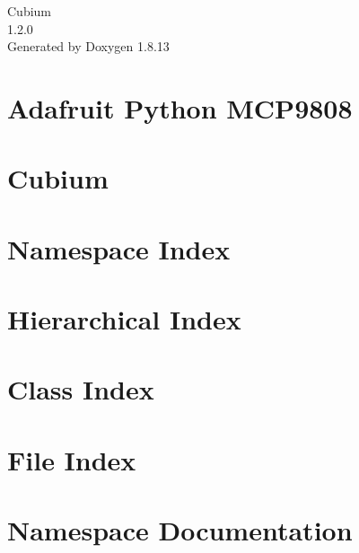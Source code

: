 \documentclass[twoside]{book}
\newcommand{\+}{\discretionary{\mbox{\scriptsize$\hookleftarrow$}}{}{}}
\newcommand{\clearemptydoublepage}{%
  \newpage{\pagestyle{empty}\cleardoublepage}%
}
\begin{document}
\hypersetup{pageanchor=false,
             bookmarksnumbered=true,
             pdfencoding=unicode
            }
\begin{titlepage}
\vspace*{7cm}
\begin{center}%
{\Large Cubium \\[1ex]\large 1.\+2.\+0 }\\
\vspace*{1cm}
{\large Generated by Doxygen 1.8.13}\\
\end{center}
\end{titlepage}
\clearemptydoublepage
{}
\tableofcontents
\clearemptydoublepage
{}
\hypersetup{pageanchor=true}

\chapter{Adafruit Python M\+C\+P9808}
\label{md_drivers_TempSensor_Adafruit_Python_MCP9808_README}

\chapter{Cubium}
\label{md_readme}

\chapter{Namespace Index}

\chapter{Hierarchical Index}

\chapter{Class Index}

\chapter{File Index}

\chapter{Namespace Documentation}





\end{document}
